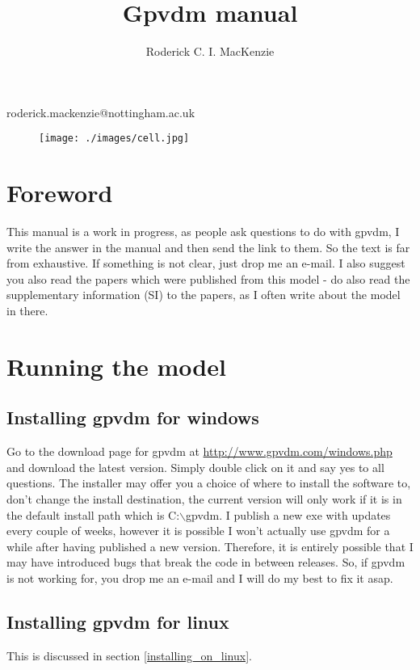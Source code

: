 \documentclass[11pt]{article}
\begin{document}
\title{Gpvdm manual}

\author{Roderick C. I. MacKenzie}


\maketitle




\centerline{roderick.mackenzie@nottingham.ac.uk}


\begin{figure}[ht!]
\centering
\texttt{[image: ./images/cell.jpg]}
\label{overflow}
\end{figure}

\newpage
\section{Foreword}
This manual is a work in progress, as people ask questions to do with gpvdm, I write the answer in the manual and then send the link to them.  So the text is far from exhaustive.  If something is not clear, just drop me an e-mail.  I also suggest you also read the papers which were published from this model - do also read the supplementary information (SI) to the papers, as I often write about the model in there.

\section{Running the model}

\subsection{Installing gpvdm for windows}
Go to the download page for gpvdm at \url{http://www.gpvdm.com/windows.php} and download the latest version.  Simply double click on it and say yes to all questions.  The installer may offer you a choice of where to install the software to, don't change the install destination, the current version will only work if it is in the default install path which is C:$\backslash$gpvdm.  I publish a new exe with updates every couple of weeks, however it is possible I won't actually use gpvdm for a while after having published a new version.  Therefore, it is entirely possible that I may have introduced bugs that break the code in between releases.  So, if gpvdm is not working for, you drop me an e-mail and I will do my best to fix it asap.

\subsection{Installing gpvdm for linux}
This is discussed in section \ref{installing_on_linux}.
\end{document}
